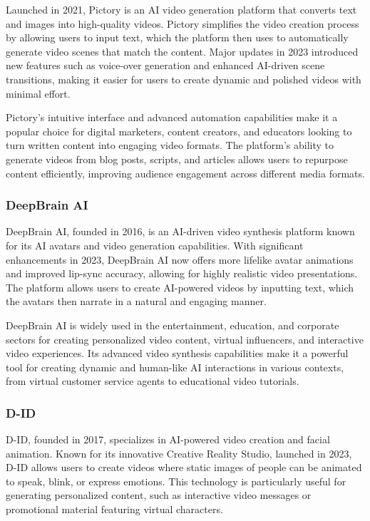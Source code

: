 Launched in 2021, Pictory is an AI video generation platform that converts text and images into high-quality videos. 
Pictory simplifies the video creation process by allowing users to input text, which the platform then uses to automatically generate video scenes that match the content. 
Major updates in 2023 introduced new features such as voice-over generation and enhanced AI-driven scene transitions, making it easier for users to create dynamic and polished videos with minimal effort.

Pictory's intuitive interface and advanced automation capabilities make it a popular choice for digital marketers, content creators, and educators looking to turn written content into engaging video formats. 
The platform's ability to generate videos from blog posts, scripts, and articles allows users to repurpose content efficiently, improving audience engagement across different media formats.

\subsubsection{DeepBrain AI}

DeepBrain AI, founded in 2016, is an AI-driven video synthesis platform known for its AI avatars and video generation capabilities. 
With significant enhancements in 2023, DeepBrain AI now offers more lifelike avatar animations and improved lip-sync accuracy, allowing for highly realistic video presentations. 
The platform allows users to create AI-powered videos by inputting text, which the avatars then narrate in a natural and engaging manner.

DeepBrain AI is widely used in the entertainment, education, and corporate sectors for creating personalized video content, virtual influencers, and interactive video experiences. 
Its advanced video synthesis capabilities make it a powerful tool for creating dynamic and human-like AI interactions in various contexts, from virtual customer service agents to educational video tutorials.

\subsubsection{D-ID}

D-ID, founded in 2017, specializes in AI-powered video creation and facial animation. 
Known for its innovative Creative Reality Studio, launched in 2023, D-ID allows users to create videos where static images of people can be animated to speak, blink, or express emotions. 
This technology is particularly useful for generating personalized content, such as interactive video messages or promotional material featuring virtual characters.

